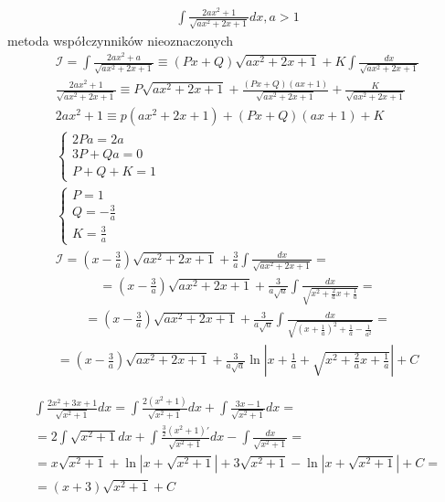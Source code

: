 \begin{gather*}\int \frac{2ax^2+1}{\sqrt{ax^2+2x+1}}dx, a>1\end{gather*}
metoda współczynników nieoznaczonych
\begin{gather*} \nonumber \mathcal{I} = \int \frac{2ax^2+a}{\sqrt{ax^2+2x+1}} \equiv (Px+Q)\sqrt{ax^2+2x+1} + K \int \frac{dx}{\sqrt{ax^2+2x+1}} \\
\frac{2ax^2+1}{\sqrt{ax^2+2x+1}} \equiv P\sqrt{ax^2+2x+1}+\frac{(Px+Q)(ax+1)}{\sqrt{ax^2+2x+1}} + \frac{K}{\sqrt{ax^2+2x+1}} \\
2ax^2+1 \equiv p(ax^2+2x+1)+(Px+Q)(ax+1)+K \\
\begin{cases} 2Pa=2a \\ 3P+Qa=0 \\ P+Q+K=1 \end{cases} \\
\begin{cases} P=1 \\ Q=-\frac{3}{a} \\ K=\frac{3}{a} \end{cases} \\
\mathcal{I} = (x-\frac{3}{a})\sqrt{ax^2+2x+1}+\frac{3}{a}\int \frac{dx}{\sqrt{ax^2+2x+1}} = \end{gather*}
\begin{gather*}= (x-\frac{3}{a})\sqrt{ax^2+2x+1} + \frac{3}{a\sqrt{a}}\int \frac{dx}{\sqrt{x^2+\frac{2}{a}x+\frac{1}{a}}} = \end{gather*}
\begin{gather*}= (x-\frac{3}{a})\sqrt{ax^2+2x+1} + \frac{3}{a\sqrt{a}}\int \frac{dx}{\sqrt{(x+\frac{1}{a})^2+\frac{1}{a}-\frac{1}{a^2}}} = \end{gather*}
\begin{gather*}= (x-\frac{3}{a})\sqrt{ax^2+2x+1} + \frac{3}{a\sqrt{a}}\ln\left|x+\frac{1}{a}+\sqrt{x^2+\frac{2}{a}x+\frac{1}{a}}\right|+C\end{gather*}


\begin{gather*}
  \int \frac{2x^2+3x+1}{\sqrt{x^2+1}}dx
  = \int \frac{2(x^2+1)}{\sqrt{x^2+1}}dx+\int \frac{3x-1}{\sqrt{x^2+1}}dx = \\
  = 2\int \sqrt{x^2+1}dx+\int \frac{\frac{3}{2}(x^2+1)'}{\sqrt{x^2+1}}dx-\int \frac{dx}{\sqrt{x^2+1}} = \\
  = x\sqrt{x^2+1}+\ln|x+\sqrt{x^2+1}|+3\sqrt{x^2+1}- \ln|x+\sqrt{x^2+1}|+C = \\
  = (x+3)\sqrt{x^2+1}+C\end{gather*}


